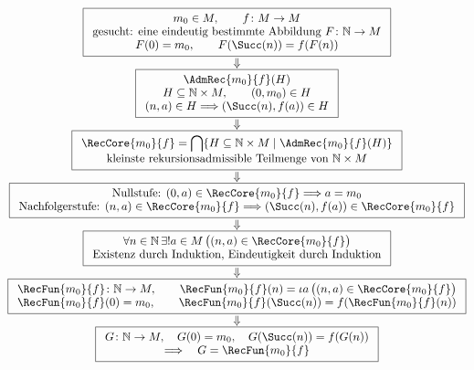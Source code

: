 \documentclass[main.tex]{subfiles}
\begin{document}
\begingroup
\footnotesize
\[
\begin{array}{@{}c@{}}
\boxed{
\begin{array}{c}
m_0\in M,\qquad f\colon M\to M
\\[-.1ex]
\text{gesucht: eine eindeutig bestimmte Abbildung }
F\colon\mathbb{N}\to M
\\[-.1ex]
F(0)=m_0,\qquad F(\Succ(n))=f(F(n))
\end{array}}
\\[1.1ex]
\Downarrow
\\[-.2ex]
\boxed{
\begin{array}{c}
\AdmRec{m_0}{f}(H)
\\[-.1ex]
H\subseteq\mathbb{N}\times M,\qquad
(0,m_0)\in H
\\[-.1ex]
(n,a)\in H\Longrightarrow(\Succ(n),f(a))\in H
\end{array}}
\\[1.1ex]
\Downarrow
\\[-.2ex]
\boxed{
\begin{array}{c}
\RecCore{m_0}{f}
=
\displaystyle\bigcap\{H\subseteq\mathbb{N}\times M
\mid \AdmRec{m_0}{f}(H)\}
\\[-.1ex]
\text{kleinste rekursionsadmissible Teilmenge von }
\mathbb{N}\times M
\end{array}}
\\[1.1ex]
\Downarrow
\\[-.2ex]
\boxed{
\begin{array}{c}
\text{Nullstufe: }(0,a)\in\RecCore{m_0}{f}
\Longrightarrow a=m_0
\\[-.1ex]
\text{Nachfolgerstufe: }(n,a)\in\RecCore{m_0}{f}
\Longrightarrow
(\Succ(n),f(a))\in\RecCore{m_0}{f}
\end{array}}
\\[1.1ex]
\Downarrow
\\[-.2ex]
\boxed{
\begin{array}{c}
\forall n\in\mathbb{N}\,\exists!a\in M\,
\bigl((n,a)\in\RecCore{m_0}{f}\bigr)
\\[-.1ex]
\text{Existenz durch Induktion, Eindeutigkeit durch Induktion}
\end{array}}
\\[1.1ex]
\Downarrow
\\[-.2ex]
\boxed{
\begin{array}{c}
\RecFun{m_0}{f}\colon\mathbb{N}\to M,
\qquad
\RecFun{m_0}{f}(n)
=
\iota a\,\bigl((n,a)\in\RecCore{m_0}{f}\bigr)
\\[-.1ex]
\RecFun{m_0}{f}(0)=m_0,\qquad
\RecFun{m_0}{f}(\Succ(n))=f(\RecFun{m_0}{f}(n))
\end{array}}
\\[1.1ex]
\Downarrow
\\[-.2ex]
\boxed{
\begin{array}{c}
G\colon\mathbb{N}\to M,\quad
G(0)=m_0,\quad
G(\Succ(n))=f(G(n))
\\[-.1ex]
\Longrightarrow\quad
G=\RecFun{m_0}{f}
\end{array}}
\end{array}
\]
\endgroup
\end{document}
